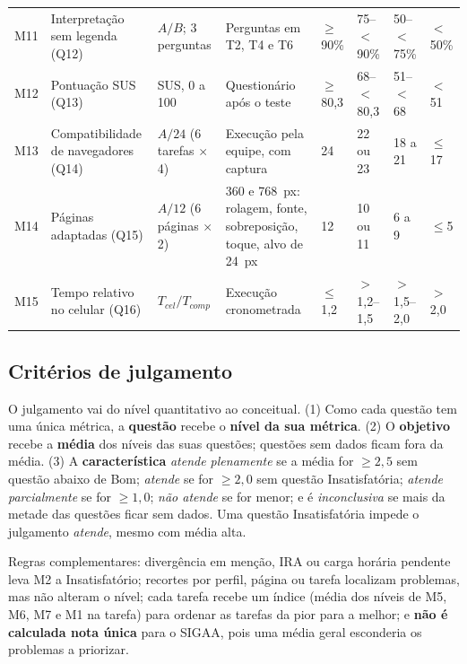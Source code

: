 \begin{table}[!t]
\begin{tabularx}{\textwidth}{L{0.55cm} L{2.6cm} L{2.7cm} Y C{1.15cm} C{1.35cm} C{1.35cm} C{1.6cm}}
		M11 & Interpretação sem legenda (Q12) & $A/B$; 3 perguntas & Perguntas em T2, T4 e T6 & $\geq$90\% & 75--$<$90\% & 50--$<$75\% & $<$50\% \\
		M12 & Pontuação SUS (Q13) & SUS, 0 a 100 & Questionário após o teste \cite{brooke1996} & $\geq$80,3 & 68--$<$80,3 & 51--$<$68 & $<$51 \\
		\midrule
		M13 & Compatibilidade de navegadores (Q14) & $A/24$ (6 tarefas $\times$ 4) & Execução pela equipe, com captura & 24 & 22 ou 23 & 18 a 21 & $\leq$17 \\
		M14 & Páginas adaptadas (Q15) & $A/12$ (6 páginas $\times$ 2) & 360 e 768~px: rolagem, fonte, sobreposição, toque, alvo de 24~px & 12 & 10 ou 11 & 6 a 9 & $\leq$5 \\
		M15 & Tempo relativo no celular (Q16) & $T_{cel}/T_{comp}$ & Execução cronometrada & $\leq$1,2 & $>$1,2--1,5 & $>$1,5--2,0 & $>$2,0 \\
		\bottomrule
	\end{tabularx}
\end{table}

\subsection{Critérios de julgamento}

O julgamento vai do nível quantitativo ao conceitual. (1) Como cada questão tem uma única métrica, a \textbf{questão} recebe o \textbf{nível da sua métrica}. (2) O \textbf{objetivo} recebe a \textbf{média} dos níveis das suas questões; questões sem dados ficam fora da média. (3) A \textbf{característica} \textit{atende plenamente} se a média for $\geq 2{,}5$ sem questão abaixo de Bom; \textit{atende} se for $\geq 2{,}0$ sem questão Insatisfatória; \textit{atende parcialmente} se for $\geq 1{,}0$; \textit{não atende} se for menor; e é \textit{inconclusiva} se mais da metade das questões ficar sem dados. Uma questão Insatisfatória impede o julgamento \textit{atende}, mesmo com média alta.

Regras complementares: divergência em menção, IRA ou carga horária pendente leva M2 a Insatisfatório; recortes por perfil, página ou tarefa localizam problemas, mas não alteram o nível; cada tarefa recebe um índice (média dos níveis de M5, M6, M7 e M1 na tarefa) para ordenar as tarefas da pior para a melhor; e \textbf{não é calculada nota única} para o SIGAA, pois uma média geral esconderia os problemas a priorizar.


